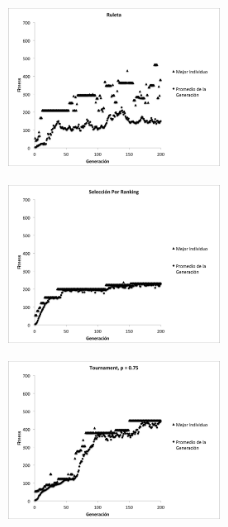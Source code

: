\documentclass[letterpaper,twocolumn,10pt]{article}
\begin{document}
\begin{figure}[h]

\includegraphics[width=0.5\textwidth]{Ruleta.png}

\caption{}
\label{img:ruleta}

\end{figure}

\begin{figure}[h]

\includegraphics[width=0.5\textwidth]{Ranking.png}

\caption{}
\label{img:ranking}

\end{figure}

\begin{figure}[h]

\includegraphics[width=0.5\textwidth]{Tournament.png}

\caption{}
\label{img:tournament}

\end{figure}
\end{document}
